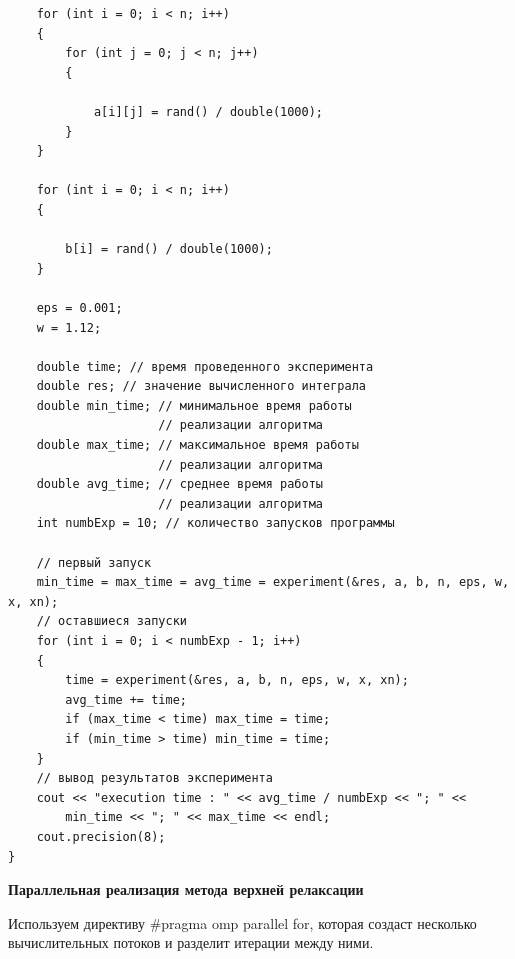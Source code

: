 \documentclass[bachelor, och, referat]{SCWorks}
\begin{document}
\begin{verbatim}
	for (int i = 0; i < n; i++)
	{
		for (int j = 0; j < n; j++)
		{

			a[i][j] = rand() / double(1000);
		}
	}

	for (int i = 0; i < n; i++)
	{

		b[i] = rand() / double(1000);
	}

	eps = 0.001;
	w = 1.12;

	double time; // время проведенного эксперимента
	double res; // значение вычисленного интеграла
	double min_time; // минимальное время работы
					 // реализации алгоритма
	double max_time; // максимальное время работы
					 // реализации алгоритма
	double avg_time; // среднее время работы
					 // реализации алгоритма
	int numbExp = 10; // количество запусков программы

	// первый запуск
	min_time = max_time = avg_time = experiment(&res, a, b, n, eps, w, x, xn);
	// оставшиеся запуски
	for (int i = 0; i < numbExp - 1; i++)
	{
		time = experiment(&res, a, b, n, eps, w, x, xn);
		avg_time += time;
		if (max_time < time) max_time = time;
		if (min_time > time) min_time = time;
	}
	// вывод результатов эксперимента
	cout << "execution time : " << avg_time / numbExp << "; " <<
		min_time << "; " << max_time << endl;
	cout.precision(8);
}
\end{verbatim}

\textbf{Параллельная реализация метода верхней релаксации} 

Используем директиву #pragma omp parallel for, которая создаст несколько вычислительных потоков и разделит итерации между ними.
\end{document}
